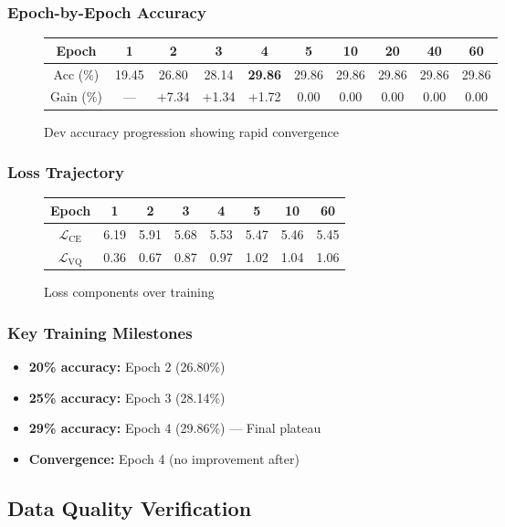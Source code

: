 \documentclass[12pt,a4paper]{article}
\begin{document}
\subsubsection{Epoch-by-Epoch Accuracy}
\begin{figure}[H]
\centering
\begin{tabular}{c|ccccccccc}
Epoch & 1 & 2 & 3 & 4 & 5 & 10 & 20 & 40 & 60 \\
\hline
Acc (\%) & 19.45 & 26.80 & 28.14 & \textbf{29.86} & 29.86 & 29.86 & 29.86 & 29.86 & 29.86 \\
Gain (\%) & — & +7.34 & +1.34 & +1.72 & 0.00 & 0.00 & 0.00 & 0.00 & 0.00 \\
\end{tabular}
\caption{Dev accuracy progression showing rapid convergence}
\end{figure}

\subsubsection{Loss Trajectory}
\begin{figure}[H]
\centering
\begin{tabular}{c|ccccccc}
Epoch & 1 & 2 & 3 & 4 & 5 & 10 & 60 \\
\hline
$\mathcal{L}_{\text{CE}}$ & 6.19 & 5.91 & 5.68 & 5.53 & 5.47 & 5.46 & 5.45 \\
$\mathcal{L}_{\text{VQ}}$ & 0.36 & 0.67 & 0.87 & 0.97 & 1.02 & 1.04 & 1.06 \\
\end{tabular}
\caption{Loss components over training}
\end{figure}

\subsubsection{Key Training Milestones}
\begin{itemize}
    \item \textbf{20\% accuracy:} Epoch 2 (26.80\%)
    \item \textbf{25\% accuracy:} Epoch 3 (28.14\%)
    \item \textbf{29\% accuracy:} Epoch 4 (29.86\%) — Final plateau
    \item \textbf{Convergence:} Epoch 4 (no improvement after)
\end{itemize}

\subsection{Data Quality Verification}
\end{document}
